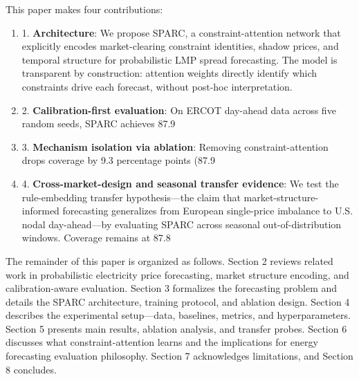 This paper makes four contributions:
\begin{enumerate}
  \item 1. \textbf{Architecture}: We propose SPARC, a constraint-attention network that explicitly encodes market-clearing constraint identities, shadow prices, and temporal structure for probabilistic LMP spread forecasting. The model is transparent by construction: attention weights directly identify which constraints drive each forecast, without post-hoc interpretation.
  \item 2. \textbf{Calibration-first evaluation}: On ERCOT day-ahead data across five random seeds, SPARC achieves 87.9%
  \item 3. \textbf{Mechanism isolation via ablation}: Removing constraint-attention drops coverage by 9.3 percentage points (87.9%
  \item 4. \textbf{Cross-market-design and seasonal transfer evidence}: We test the rule-embedding transfer hypothesis---the claim that market-structure-informed forecasting generalizes from European single-price imbalance to U.S. nodal day-ahead---by evaluating SPARC across seasonal out-of-distribution windows. Coverage remains at 87.8%
\end{enumerate}
The remainder of this paper is organized as follows. Section 2 reviews related work in probabilistic electricity price forecasting, market structure encoding, and calibration-aware evaluation. Section 3 formalizes the forecasting problem and details the SPARC architecture, training protocol, and ablation design. Section 4 describes the experimental setup---data, baselines, metrics, and hyperparameters. Section 5 presents main results, ablation analysis, and transfer probes. Section 6 discusses what constraint-attention learns and the implications for energy forecasting evaluation philosophy. Section 7 acknowledges limitations, and Section 8 concludes.

